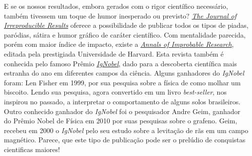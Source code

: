 E se os nossos resultados, embora gerados com o rigor científico necessário, também tivessem um toque de humor inesperado ou previsto? \href{http://www.jir.com/index.html}{\textit{The Journal of Irreproducible Results}} oferece a possibilidade de publicar todos os tipos de piadas, paródias, sátira e humor gráfico de caráter científico. Com mentalidade parecida, porém com maior índice de impacto, existe a \href{http://www.improbable.com/}{\textit{Annals of Improbable Research}}, editada pela prestigiada Universidade de Harvard. Esta revista  também é conhecida pelo famoso Prêmio \href{http://www.improbable.com/ig/winners/}{\textit{IgNobel}}, dado para a descoberta científica mais estranha do ano em diferentes campos da ciência. Alguns ganhadores do \textit{IgNobel} foram: Len Fisher em 1999, por sua pesquisa sobre a física de como molhar um biscoito. Lendo sua pesquisa, agora convertido em um livro \textit{best-seller}, nos inspirou no passado, a interpretar o comportamento de alguns solos brasileiros. Outro conhecido ganhador do \textit{IgNobel} foi o pesquisador Andre Geim, ganhador do Prêmio Nobel de Física em 2010 por suas pesquisas sobre o grafeno. Geim, recebeu em 2000 o \textit{IgNobel} pelo seu estudo sobre a levitação de rãs em um campo magnético. Parece, que este tipo de publicação pode ser o prelúdio de conquistas cientificas maiores!

\address{Vidal Barrón\\
  Universidade de Córdoba, UCO, Espanha\\
  \url{http://www.researchgate.net/profile/Vidal\_Barron}\\
  }

